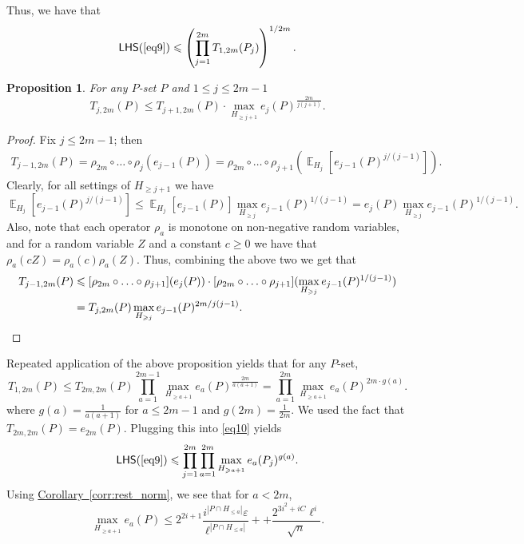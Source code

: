 \documentclass[11pt]{article}
\newcommand{\expref}[2]{\texorpdfstring{\hyperref[#2]{#1~\ref{#2}}}{#1~\ref{#2}}}
\newtheorem{proposition}[theorem]{Proposition}
\newcommand\card[1]{\left| {#1} \right|}
\newcommand\Expect[2]{{\mathop{\mathbb{E}}_{#1}\left[ {#2} \right]}}
\newcommand\eps{\varepsilon}
\renewcommand\geq{\geqslant}
\renewcommand\leq{\leqslant}
\begin{document}
Thus, we have that
\begin{equation}\label{eq10}
  {\sf LHS}(\ref{eq9})\leq \left(\prod\limits_{j=1}^{2m}{T_{1,2m}(P_j)}\right)^{1/2m}.
\end{equation}

\begin{proposition}
For any $P$-set $P$ and $1\leq j\leq 2m-1$
\[
T_{j,2m}(P)
\leq T_{j+1,2m}(P)\cdot \max_{H_{\geq j+1}}{e_{j}(P)^{\frac{2m}{j(j+1)}}}.
\]
\end{proposition}
\begin{proof}
Fix $j\leq 2m-1$; then
\begin{align*}
T_{j-1,2m}(P)
 = \rho_{2m}\circ\ldots\circ\rho_{j}\left(e_{j-1}(P)\right)
 = \rho_{2m}\circ\ldots\circ\rho_{j+1}\left(\Expect{H_{j}}{e_{j-1}(P)^{j/(j-1)}}\right).
\end{align*}
Clearly, for all settings of $H_{\geq j+1}$ we have
\[
\Expect{H_{j}}{e_{j-1}(P)^{j/(j-1)}}
\leq \Expect{H_{j}}{e_{j-1}(P)} \max_{H_{\geq j}}{e_{j-1}(P)^{1/(j-1)}}
=e_j(P)\max_{H_{\geq j}}{e_{j-1}(P)^{1/(j-1)}}.
\]
Also, note that each operator $\rho_a$ is monotone on non-negative random variables, and
for a random variable $Z$ and a constant $c\geq 0$ we have that $\rho_a(cZ) = \rho_a(c) \rho_a(Z)$.
Thus, combining the above two we get that
\begin{align*}
T_{j-1,2m}(P)
&\leq
[\rho_{2m}\circ\ldots\circ\rho_{j+1}](e_j(P))\cdot
[\rho_{2m}\circ\ldots\circ\rho_{j+1}](\max_{H_{\geq j}}{e_{j-1}(P)^{1/(j-1)}})\\
&= T_{j,2m}(P) \max_{H_{\geq j}}{e_{j-1}(P)^{2m/j(j-1)}}.
\qedhere %
\end{align*}
\end{proof}
Repeated application of the above proposition yields that for any $P$-set,
\[
T_{1,2m}(P)
\leq
T_{2m,2m}(P)\prod\limits_{a=1}^{2m-1}{\max_{H_{\geq a+1}}{e_{a}(P)^{\frac{2m}{a(a+1)}}}}
=\prod\limits_{a=1}^{2m}{\max_{H_{\geq a+1}}{e_{a}(P)^{2m \cdot g(a)}}}.
\]
where $g(a) = \frac{1}{a(a+1)}$ for $a\leq 2m-1$ and $g(2m) = \frac{1}{2m}$. We used the fact that $T_{2m,2m}(P) = e_{2m}(P)$.
Plugging this into \eqref{eq10} yields
\begin{equation}\label{eq10'}
{\sf LHS}(\ref{eq9})\leq \prod\limits_{j=1}^{2m}{\prod\limits_{a=1}^{2m}{\max_{H_{\geq a+1}}{e_{a}(P_j)^{g(a)}}}}.
\end{equation}
Using \expref{Corollary}{corr:rest_norm}, we see that for $a<2m$,
\[
\max_{H_{\geq a+1}} e_a(P)
\leq 2^{2i+1}\frac{i^{\card{P\cap H_{\leq a}}} \eps}{\ell^{\card{P\cap H_{\leq a}}}} +
+\frac{2^{3i^2+iC} \ell^{i}}{\sqrt{n}}.
\]
\end{document}
